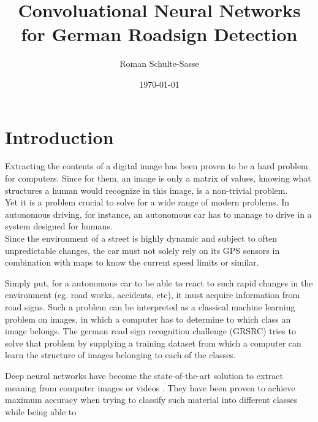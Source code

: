 \documentclass[11pt,a4paper]{article}
\title{Convoluational Neural Networks for German Roadsign Detection}
\author{Roman Schulte-Sasse}
\date{\today}
\begin{document}
\maketitle
\clearpage


\section{Introduction}
Extracting the contents of a digital image has been proven to be a hard problem for computers. Since for them, an image is only a matrix of values, knowing what structures a human would recognize in this image, is a non-trivial problem.\\
Yet it is a problem crucial to solve for a wide range of modern problems. In autonomous driving, for instance, an autonomous car has to manage to drive in a system designed for humans.\\
Since the environment of a street is highly dynamic and subject to often unpredictable changes, the car must not solely rely on its GPS sensors in combination with maps to know the current speed limits or similar.

Simply put, for a autonomous car to be able to react to such rapid changes in the environment (eg. road works, accidents, etc), it must acquire information from road signs.
Such a problem can be interpreted as a classical machine learning problem on images, in which a computer has to determine to which class an image belongs.
The german road sign recognition challenge (GRSRC) tries to solve that problem by supplying a training dataset from which a computer can learn the structure of images belonging to each of the classes.

Deep neural networks have become the state-of-the-art solution to extract meaning from computer images or videos . They have been proven to achieve maximum accuracy when trying to classify such material into different classes while being able to 
\end{document}
